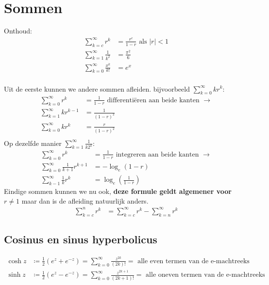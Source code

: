 \documentclass{article}
\begin{document}
	\tableofcontents
	\newpage
	\section{Sommen}
 		Onthoud:
 		\begin{align*}
 			\sum_{k=c}^{\infty} r^k &= \frac{r^c}{1-r} \text{ als $|r|<1$}\\
 			\sum_{k=1}^{\infty} \frac{1}{k^2} &= \frac{\pi^2}{6} \\
 			\sum_{k=0}^\infty \frac{x^k}{k!} &= e^x \\
 		\end{align*}
 		
 		Uit de eerste kunnen we andere sommen afleiden. bijvoorbeeld 
 		$\displaystyle \sum_{k=0}^{\infty} kr^k: $
 		\begin{align*}
 				\sum_{k=0}^{\infty} r^k &= \frac{1}{1-r} \text { differenti\"eren aan beide kanten } \to \\
 				\sum_{k=1}^{\infty} kr^{k-1} &= \frac{1}{(1-r)^2} \\
 				\sum_{k=0}^{\infty} kr^k &= \frac{r}{(1-r)^2} \\
 		\end{align*}
 		Op dezelfde manier $\displaystyle \sum_{k=1}^{\infty} \frac{1}{k2^k}$:
 		\begin{align*}
 				\sum_{k=0}^{\infty} r^k &= \frac{1}{1-r} \text { integreren aan beide kanten } \to \\
 				\sum_{k=0}^{\infty} \frac{1}{k+1} r^{k+1} &= -\log_e (1-r) \\
 				\sum_{k-1}^\infty \frac{1}{k} r^k &= \log_e (\frac{1}{1-r})
 		\end{align*}
 		Eindige sommen kunnen we nu ook, \textbf{deze formule geldt algemener voor $r\neq 1$} maar dan is de afleiding natuurlijk anders.
 		\begin{align*}
 			\sum_{k=c}^n r^k &= \sum_{k=c}^\infty r^k - \sum_{k=n}^\infty r^k
 		\end{align*}

	\subsection{Cosinus en sinus hyperbolicus}
		\begin{align*}
			\cosh z &\coloneqq \frac{1}{2} (e^z + e^{-z}) = \sum_{k=0}^\infty \frac{z^{2k}}{(2k)!} = \text{ alle even termen van de e-machtreeks} \\
			\sinh z &\coloneqq \frac{1}{2} (e^z - e^{-z}) = \sum_{k=0}^\infty \frac{z^{2k+1}}{(2k+1)!} = \text{ alle oneven termen van de e-machtreeks}
		\end{align*}
\end{document}
